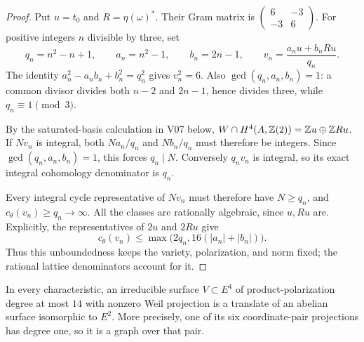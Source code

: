 \begin{proof}
Put $u=t_0$ and $R=\eta(\omega)^*$. Their Gram matrix is
$\left(\begin{smallmatrix}6&-3\\-3&6\end{smallmatrix}\right)$.
For positive integers $n$ divisible by three, set
\[
 q_n=n^2-n+1,\qquad a_n=n^2-1,\qquad b_n=2n-1,\qquad
 v_n=\frac{a_nu+b_nRu}{q_n}.
\]
The identity $a_n^2-a_nb_n+b_n^2=q_n^2$ gives $v_n^2=6$.
Also $\gcd(q_n,a_n,b_n)=1$: a common divisor divides both $n-2$
and $2n-1$, hence divides three, while $q_n\equiv1\pmod3$.

By the saturated-basis calculation in V07 below,
$W\cap H^4(A,\mathbb Z(2))=\mathbb Z u\oplus\mathbb Z Ru$.
If $Nv_n$ is integral, both $Na_n/q_n$ and $Nb_n/q_n$ must therefore
be integers. Since $\gcd(q_n,a_n,b_n)=1$, this forces $q_n\mid N$.
Conversely $q_nv_n$ is integral, so its exact integral cohomology
denominator is $q_n$.

Every integral cycle representative of $Nv_n$ must therefore have
$N\geq q_n$, and $c_\theta(v_n)\geq q_n\to\infty$.
All the classes are rationally algebraic, since $u,Ru$ are. Explicitly,
the representatives of $2u$ and $2Ru$ give
\[
 c_\theta(v_n)\leq
 \max\bigl(2q_n,16(|a_n|+|b_n|)\bigr).
\]
Thus this unboundedness keeps the variety, polarization, and norm fixed;
the rational lattice denominators account for it.
\end{proof}

\begin{lemma}
In every characteristic, an irreducible surface $V\subset E^4$ of
product-polarization degree at most $14$ with nonzero Weil projection
is a translate of an abelian surface isomorphic to $E^2$. More precisely,
one of its six coordinate-pair projections has degree one, so it is a
graph over that pair.
\end{lemma}

